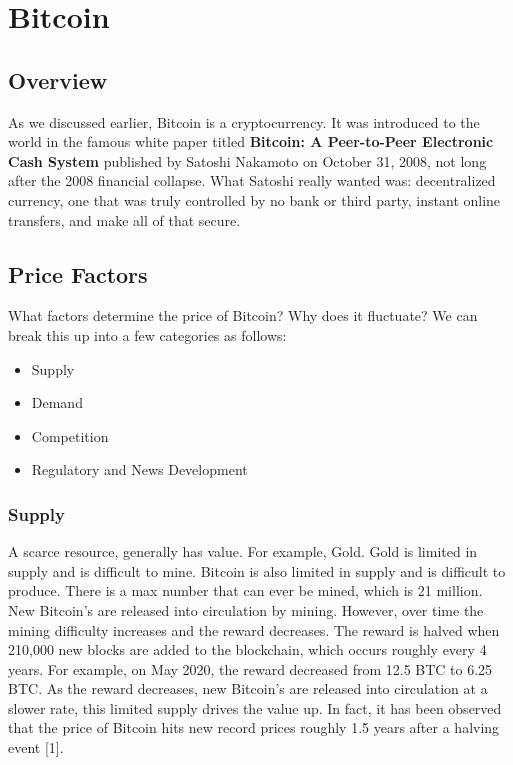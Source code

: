 \documentclass[11pt]{article} %
\begin{document}
\section{Bitcoin}{}
\subsection{Overview}{}
As we discussed earlier, Bitcoin is a cryptocurrency. It was introduced to the world in the famous white paper titled \textbf{Bitcoin: A Peer-to-Peer Electronic Cash System} published by Satoshi Nakamoto on October 31, 2008, not long after the 2008 financial collapse. What Satoshi really wanted was: decentralized currency, one that was truly controlled by no bank or third party, instant online transfers, and make all of that secure.

\subsection{Price Factors}{}
What factors determine the price of Bitcoin? Why does it fluctuate? We can break this up into a few categories as follows:

\begin{itemize}
\item Supply
\item Demand
\item Competition
\item Regulatory and News Development
\end{itemize}

\subsubsection{Supply}{}
A scarce resource, generally has value. For example, Gold. Gold is limited in supply and is difficult to mine. Bitcoin is also limited in supply and is difficult to produce. There is a max number that can ever be mined, which is 21 million. New Bitcoin's are released into circulation by mining. However, over time the mining difficulty increases and the reward decreases. The reward is halved when 210,000 new blocks are added to the blockchain, which occurs roughly every 4 years. For example, on May 2020, the reward decreased from 12.5 BTC to 6.25 BTC. As the reward decreases, new Bitcoin's are released into circulation at a slower rate, this limited supply drives the value up. In fact, it has been observed that the price of Bitcoin hits new record prices roughly 1.5 years after a halving event [1].
\end{document}
